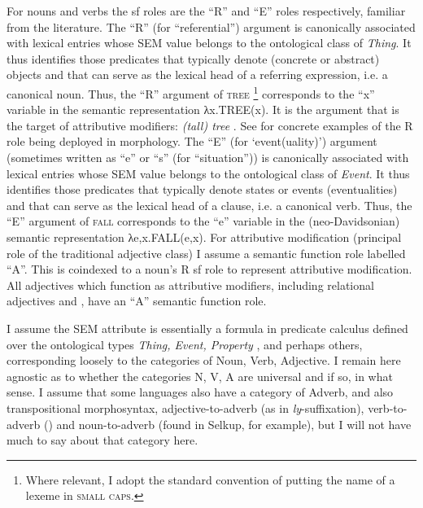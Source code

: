 \documentclass[output=paper,
modfonts
]{LSP/langsci}
\begin{document}
For nouns and verbs the sf roles are the ``R'' and ``E'' roles respectively, familiar from the literature. The ``R'' (for ``referential'') 
argument is canonically associated with lexical entries whose SEM value belongs to the ontological class of \textit{Thing}.
It thus identifies those predicates that typically denote (concrete or abstract) objects and that can serve as the lexical head of a referring expression, i.e. a canonical noun.  Thus, the ``R'' argument of \textsc{tree}%
\footnote{Where relevant, I adopt the standard convention of putting the name of a lexeme in \textsc{small caps}.} %
 corresponds to the ``x'' variable in the semantic representation λx.TREE(x). It is the argument that is the target of attributive modifiers: \emph{(tall) tree} \parencite{Spencer99:transpositions}.
See \citet[16; 55]{Lieber04:book} for concrete examples of the R role being deployed in morphology.
The ``E'' (for ‘event(uality)’) argument (sometimes written as ``e'' or ``s'' (for ``situation'')) is canonically associated with lexical entries whose SEM value belongs to the ontological class of \textit{Event}. It thus identifies those predicates that typically denote states or events (eventualities)  and that can serve as the lexical head of a clause, i.e. a canonical verb.  Thus, the ``E'' argument of \textsc{fall} corresponds to the ``e'' variable in the (neo-Davidsonian) semantic representation λe,x.{FALL}(e,x). For attributive modification (principal role of the traditional adjective class) I assume a semantic function role labelled ``A''. This is coindexed to a noun’s R sf role to represent attributive modification. All adjectives which function as attributive modifiers, including relational adjectives and , have an ``A'' semantic function role.

I assume the SEM attribute is essentially a formula in predicate calculus defined over the ontological types \textit{Thing, Event, Property} \parencite{Jackendoff90}, %
and perhaps others, corresponding loosely to the  categories of Noun, Verb, Adjective. I remain here agnostic as to whether the categories N, V, A are universal and if so, in what sense. I assume that some languages also have a category of Adverb, and also transpositional morphosyntax, adjective-to-adverb (as in  \emph{ly}-suffixation), verb-to-adverb () and noun-to-adverb (found in Selkup, for example), but I will not have much to say about that category here.
\end{document}

